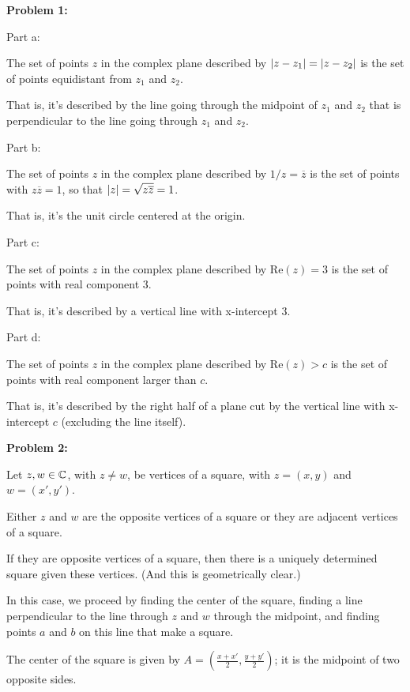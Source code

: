 \documentclass[a4paper,12pt]{article}
\begin{document}
{\bf Problem 1:} %

Part a:

The set of points $z$ in the complex plane described by $\left\lvert z-z_1 \right\rvert=\left\lvert z-z_2 \right\rvert$ is the set of points equidistant from $z_1$ and $z_2$.

That is, it's described by the line going through the midpoint of $z_1$ and $z_2$ that is perpendicular to the line going through $z_1$ and $z_2$.

\shunt

Part b:

The set of points $z$ in the complex plane described by $1/z=\overline{z}$ is the set of points with $z \overline{z} = 1$, so that $\left\lvert z \right\rvert = \sqrt{z \overline{z}} = 1$.

That is, it's the unit circle centered at the origin.

\shunt

Part c:

The set of points $z$ in the complex plane described by $\text{Re}(z)=3$ is the set of points with real component $3$.

That is, it's described by a vertical line with x-intercept $3$.

\shunt

Part d:

The set of points $z$ in the complex plane described by $\text{Re}(z)>c$ is the set of points with real component larger than $c$.

That is, it's described by the right half of a plane cut by the vertical line with x-intercept $c$ (excluding the line itself).

\shunt

{\bf Problem 2:}

Let $z,w \in \mathbb{C}$, with $z \neq w$, be vertices of a square, with $z = (x,y)$ and $w = (x',y')$.

Either $z$ and $w$ are the opposite vertices of a square or they are adjacent vertices of a square.

If they are opposite vertices of a square, then there is a uniquely determined square given these vertices. (And this is geometrically clear.) 

\tab In this case, we proceed by finding the center of the square, finding a line perpendicular to the line through $z$ and $w$ through the midpoint, and finding points $a$ and $b$ on this line that make a square.

\tab The center of the square is given by $A=(\frac{x+x'}{2},\frac{y+y'}{2})$; it is the midpoint of two opposite sides. 
\end{document}
